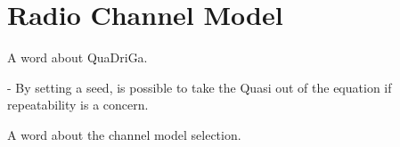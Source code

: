 \section{Radio Channel Model}
\label{sec:radio_channel_model}


A word about QuaDriGa.

- By setting a seed, is possible to take the Quasi out of the equation if repeatability is a concern.



A word about the channel model selection.


